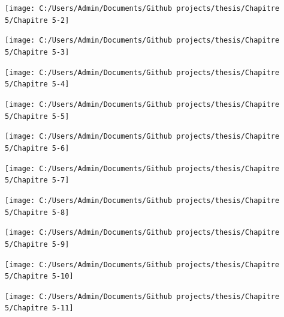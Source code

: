 \documentclass[
  english,
  man]{apa6}
\begin{document}
\begin{center}\texttt{[image: C:/Users/Admin/Documents/Github projects/thesis/Chapitre 5/Chapitre 5-2]} \end{center}

\begin{center}\texttt{[image: C:/Users/Admin/Documents/Github projects/thesis/Chapitre 5/Chapitre 5-3]} \end{center}

\begin{center}\texttt{[image: C:/Users/Admin/Documents/Github projects/thesis/Chapitre 5/Chapitre 5-4]} \end{center}

\begin{center}\texttt{[image: C:/Users/Admin/Documents/Github projects/thesis/Chapitre 5/Chapitre 5-5]} \end{center}

\begin{center}\texttt{[image: C:/Users/Admin/Documents/Github projects/thesis/Chapitre 5/Chapitre 5-6]} \end{center}

\begin{center}\texttt{[image: C:/Users/Admin/Documents/Github projects/thesis/Chapitre 5/Chapitre 5-7]} \end{center}

\begin{center}\texttt{[image: C:/Users/Admin/Documents/Github projects/thesis/Chapitre 5/Chapitre 5-8]} \end{center}

\begin{center}\texttt{[image: C:/Users/Admin/Documents/Github projects/thesis/Chapitre 5/Chapitre 5-9]} \end{center}

\begin{center}\texttt{[image: C:/Users/Admin/Documents/Github projects/thesis/Chapitre 5/Chapitre 5-10]} \end{center}

\begin{center}\texttt{[image: C:/Users/Admin/Documents/Github projects/thesis/Chapitre 5/Chapitre 5-11]} \end{center}
\end{document}
